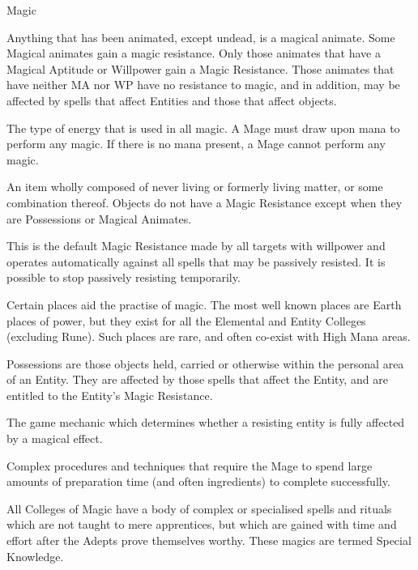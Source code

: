 \begin{Chapter}{Magic}
\begin{Description}
\item[Magical Animates] Anything that has been animated, except
  undead, is a magical animate. Some Magical animates gain a magic
  resistance.  Only those animates that have a Magical Aptitude or
  Willpower gain a Magic Resistance.  Those animates that have
  neither MA nor WP have no resistance to magic, and in addition,
  may be affected by spells that affect Entities and those that affect
  objects.

\item[Mana] The type of energy that is used in all magic.  A Mage must
  draw upon mana to perform any magic.  If there is no mana present, a
  Mage cannot perform any magic.

\item[Object] An item wholly composed of never living or formerly
  living matter, or some combination thereof.  Objects do not have a
  Magic Resistance except when they are Possessions or Magical
  Animates.

\item[Passive Resistance] This is the default Magic Resistance made by
  all targets with willpower and operates automatically against all
  spells that may be passively resisted.  It is possible to stop
  passively resisting temporarily.

\item[Place of Power] Certain places aid the practise of magic.  The
  most well known places are Earth places of power, but they exist for
  all the Elemental and Entity Colleges (excluding Rune). Such places
  are rare, and often co-exist with High Mana areas.

\item[Possessions] Possessions are those objects held, carried or
  otherwise within the personal area of an Entity. They are affected
  by those spells that affect the Entity, and are entitled to the
  Entity’s Magic Resistance.

\item[Resistance Check] The game mechanic which determines whether a
  resisting entity is fully affected by a magical effect.

\item[Ritual Magic] Complex procedures and techniques that require the
  Mage to spend large amounts of preparation time (and often
  ingredients) to complete successfully.

\item[Special Knowledge] All Colleges of Magic have a body of complex
  or specialised spells and rituals which are not taught to mere
  apprentices, but which are gained with time and effort after the
  Adepts prove themselves worthy. These magics are termed Special
  Knowledge.


\end{Description}
\end{Chapter}
